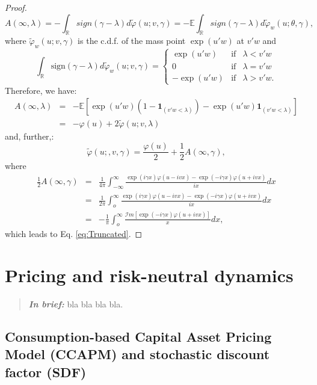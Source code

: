 \documentclass[
  12pt,
]{book}
\theoremstyle{definition}
\theoremstyle{definition}
\theoremstyle{definition}
\theoremstyle{definition}
\theoremstyle{remark}
\begin{document}
\begin{proof}
\[
A(\infty,\lambda) = -  \int_{\mathbb{R}} sign(\gamma-\lambda)d\tilde{\varphi}(u;v,\gamma) = -\mathbb{E}  \int_{\mathbb{R}} sign(\gamma-\lambda)d\tilde{\varphi}_w(u;\theta,\gamma),
\]
where \(\tilde{\varphi}_w(u;v,\gamma)\) is the c.d.f. of the mass point \(\exp(u'w)\) at \(v'w\) and
\[
\int_{\mathbb{R}} \mbox{sign}(\gamma-\lambda)d\tilde{\varphi}_w(u;v,\gamma)=
\left\{
\begin{array}{ccc}
\exp(u'w) & \mbox{if} & \lambda < v'w \\
0 & \mbox{if}& \lambda = v'w \\
-\exp(u'w) & \mbox{if} & \lambda > v'w.
\end{array}
\right.
\]
Therefore, we have:
\begin{eqnarray*}
A(\infty,\lambda) & =& - \mathbb{E}[\exp(u'w)(1-\textbf{1}_{(v'w<\lambda)})-\exp(u'w)\textbf{1}_{(v'w<\lambda)}] \\
& =& - \varphi(u) + 2\tilde{\varphi}(u;v,\lambda)
\end{eqnarray*}
and, further,:
\[
\tilde{\varphi}(u;,v,\gamma) =  \frac{\varphi(u)}{2} +  \frac{1}{2} A(\infty,\gamma),
\]
where
\begin{eqnarray*}
\frac{1}{2} A(\infty,\gamma) & =&  \frac{1}{4\pi} \int^{\infty}_{-\infty}  \frac{\exp(i\gamma x)\varphi(u-ivx)-\exp(-i\gamma x)\varphi(u+ivx)}{ix} dx \\
& =&  \frac{1}{2\pi} \int^{\infty}_{o}  \frac{\exp(i\gamma x)\varphi(u-ivx)-\exp(-i\gamma x)\varphi(u+ivx)}{ix} dx \\
& =& -  \frac{1}{\pi} \int^{\infty}_{o}  \frac{{\mathcal I}m[\exp(-i\gamma x)\varphi(u+ivx)]}{x}dx,
\end{eqnarray*}
which leads to Eq. \eqref{eq:Truncated}.
\end{proof}

\hypertarget{pricing-and-risk-neutral-dynamics}{%
\chapter{Pricing and risk-neutral dynamics}\label{pricing-and-risk-neutral-dynamics}}

\begin{quote}
\textbf{\emph{In brief:}} bla bla bla bla.
\end{quote}

\hypertarget{PricingEquilibrium}{%
\section{Consumption-based Capital Asset Pricing Model (CCAPM) and stochastic discount factor (SDF)}\label{PricingEquilibrium}}
\end{document}
